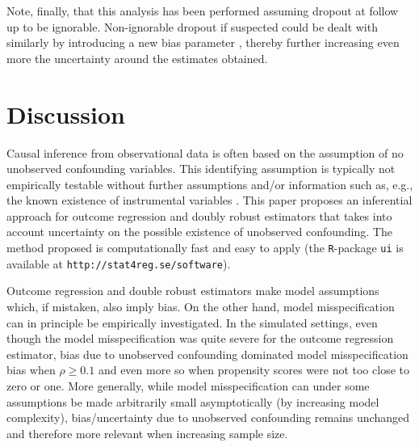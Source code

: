\documentclass[11pt]{article}
\begin{document}
Note, finally, that this analysis has been performed assuming dropout at follow up to be ignorable. Non-ignorable dropout if suspected could be dealt with similarly by introducing a new bias parameter \citep{Genback:2015}, thereby further increasing even more the uncertainty around the estimates obtained.





\section{Discussion}
Causal inference from observational data is often based on the assumption of no unobserved confounding variables. This identifying assumption is typically not empirically testable without further assumptions and/or information such as, e.g., the known existence of instrumental variables \citep{LunaJ:2014}. This paper proposes an inferential approach for outcome regression and doubly robust estimators that takes into account uncertainty on the possible existence of unobserved confounding. The method proposed is computationally fast and easy to apply (the \texttt{R}-package \texttt{ui} is available at \texttt{http://stat4reg.se/software}). 

Outcome regression and double robust estimators make model assumptions which, if mistaken, also imply bias.  On the other hand, model misspecification can in principle be empirically investigated. In the simulated settings, even though the model misspecification was quite severe for the outcome regression estimator, bias due to unobserved confounding dominated model misspecification bias when $\rho \geq 0.1$ and even more so when propensity scores were not too close to zero or one. More generally, while model misspecification can under some assumptions be made arbitrarily small asymptotically (by increasing model complexity), bias/uncertainty due to unobserved confounding remains unchanged and therefore more relevant when increasing sample size.
\end{document}
